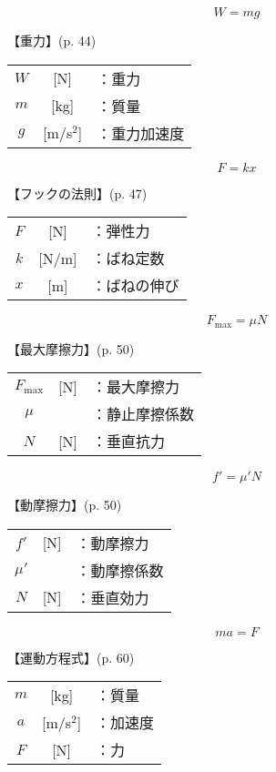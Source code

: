 \documentclass[10pt]{jarticle}
\begin{document}
\newpage
\[
	W = mg
\]


\vskip3mm
【重力】{\footnotesize (p. 44)}

\begin{tabular}{ccl}
$W$	&[N]	&：重力\\
$m$	&[kg]	&：質量\\
$g$	&[m/s$^2$]	&：重力加速度
\end{tabular}






\newpage
\[
	F = k x
\]


\vskip3mm
【フックの法則】{\footnotesize (p. 47)}

\begin{tabular}{ccl}
$F$	&[N]	&：弾性力\\
$k$	&[N/m]	&：ばね定数\\
$x$	&[m]	&：ばねの伸び
\end{tabular}






\newpage
\[
	F_\mathrm{max} =  \mu N
\]


\vskip3mm
【最大摩擦力】{\footnotesize (p. 50)}

\begin{tabular}{ccl}
$F_\mathrm{max}$	&[N]	&：最大摩擦力\\
$\mu$	&	&：静止摩擦係数\\
$N$	&[N]	&：垂直抗力
\end{tabular}





\newpage
\[
	f' =  \mu' N
\]


\vskip3mm
【動摩擦力】{\footnotesize (p. 50)}

\begin{tabular}{ccl}
$f'$	&[N]	&：動摩擦力\\
$\mu'$	&	&：動摩擦係数\\
$N$	&[N]	&：垂直効力
\end{tabular}





\newpage
\[
	m a = F
\]


\vskip3mm
【運動方程式】{\footnotesize (p. 60)}

\begin{tabular}{ccl}
$m$	&[kg]	&：質量\\
$a$	&[m/s$^2$]	&：加速度\\
$F$	&[N]	&：力
\end{tabular}
\end{document}
